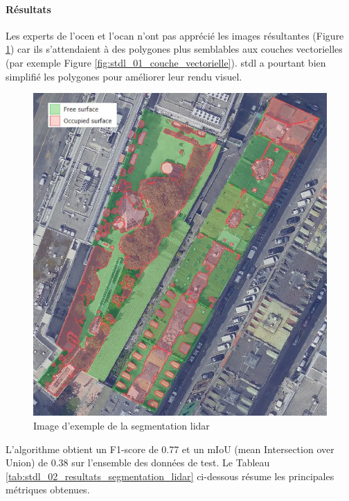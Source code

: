 \paragraph{Résultats}
\par{Les experts de l'\acrshort{ocen} et l'\acrshort{ocan} n'ont pas apprécié les images résultantes (Figure \ref{fig:stdl_05_exemple_segmentation_lidar}) car ils s'attendaient à des polygones plus semblables aux couches vectorielles (par exemple Figure \ref{fig:stdl_01_couche_vectorielle}). \acrshort{stdl} a pourtant bien simplifié les polygones pour améliorer leur rendu visuel.}
\begin{figure}[H]
    \centering
    \includegraphics[width=1\linewidth]{02-main//figures/ch2/stdl_05_exemple_segmentation_lidar.png}
    \caption{Image d’exemple de la segmentation \gls{lidar} \cite{herny_detection_2024}}
    \label{fig:stdl_05_exemple_segmentation_lidar}
\end{figure}
\newpage
\par{L'algorithme obtient un F1-score de 0.77 et un mIoU (mean Intersection over Union) de 0.38 sur l'ensemble des données de test. Le Tableau \ref{tab:stdl_02_resultats_segmentation_lidar} ci-dessous résume les principales métriques obtenues.}
